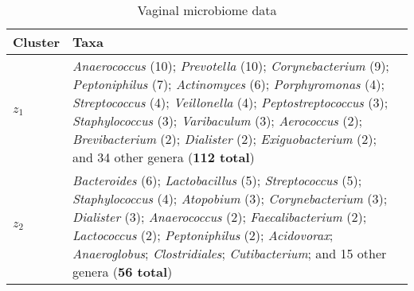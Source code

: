 \begin{table}[ht]
\centering
\caption{Vaginal microbiome data}
\label{tab:vaginal_taxa}
\begin{tabular}{p{1.2cm}p{12cm}}
\toprule
Cluster & Taxa \\
\midrule
$z_{1}$ & \textit{Anaerococcus} (10); \textit{Prevotella} (10); \textit{Corynebacterium} (9); \textit{Peptoniphilus} (7); \textit{Actinomyces} (6); \textit{Porphyromonas} (4); \textit{Streptococcus} (4); \textit{Veillonella} (4); \textit{Peptostreptococcus} (3); \textit{Staphylococcus} (3); \textit{Varibaculum} (3); \textit{Aerococcus} (2); \textit{Brevibacterium} (2); \textit{Dialister} (2); \textit{Exiguobacterium} (2); and 34 other genera (\textbf{112 total}) \\
\addlinespace
$z_{2}$ & \textit{Bacteroides} (6); \textit{Lactobacillus} (5); \textit{Streptococcus} (5); \textit{Staphylococcus} (4); \textit{Atopobium} (3); \textit{Corynebacterium} (3); \textit{Dialister} (3); \textit{Anaerococcus} (2); \textit{Faecalibacterium} (2); \textit{Lactococcus} (2); \textit{Peptoniphilus} (2); \textit{Acidovorax}; \textit{Anaeroglobus}; \textit{Clostridiales}; \textit{Cutibacterium}; and 15 other genera (\textbf{56 total}) \\
\bottomrule
\end{tabular}
\end{table}